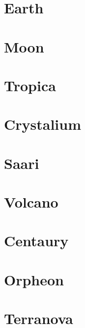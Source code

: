 \section{Earth}
\section{Moon}
\section{Tropica}
\section{Crystalium}
\section{Saari}
\section{Volcano}
\section{Centaury}
\section{Orpheon}
\section{Terranova}